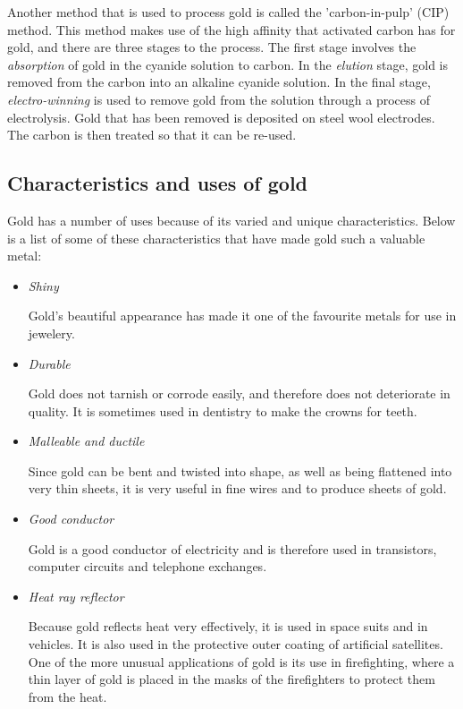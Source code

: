 \begin{IFact}{
Another method that is used to process gold is called the 'carbon-in-pulp' (CIP) method. This method makes use of the high affinity that activated carbon has for gold, and there are three stages to the process. The first stage involves the \emph{absorption} of gold in the cyanide solution to carbon. In the \emph{elution} stage, gold is removed from the carbon into an alkaline cyanide solution. In the final stage, \emph{electro-winning} is used to remove gold from the solution through a process of electrolysis. Gold that has been removed is deposited on steel wool electrodes. The carbon is then treated so that it can be re-used.}
\end{IFact}

\subsection{Characteristics and uses of gold}
Gold has a number of uses because of its varied and unique characteristics. Below is a list of some of these characteristics that have made gold such a valuable metal:
\begin{itemize}

\item \emph{Shiny}

Gold's beautiful appearance has made it one of the favourite metals for use in jewelery.

\item \emph{Durable}

Gold does not tarnish or corrode easily, and therefore does not deteriorate in quality. It is sometimes used in dentistry to make the crowns for teeth.

\item \emph{Malleable and ductile}

Since gold can be bent and twisted into shape, as well as being flattened into very thin sheets, it is very useful in fine wires and to produce sheets of gold. 

\item \emph{Good conductor}

Gold is a good conductor of electricity and is therefore used in transistors, computer circuits and telephone exchanges.

\item \emph{Heat ray reflector}

Because gold reflects heat very effectively, it is used in space suits and in vehicles. It is also used in the protective outer coating of artificial satellites. One of the more unusual applications of gold is its use in firefighting, where a thin layer of gold is placed in the masks of the firefighters to protect them from the heat.

\end{itemize}

